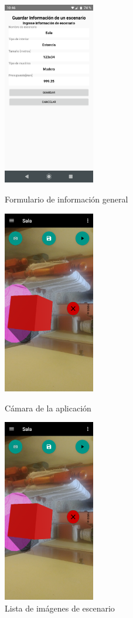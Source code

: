 \begin{figure}[hbt!]
	\begin{minipage}{0.32\textwidth}
		\centering
		\includegraphics[width=4cm,height=8cm]{imagenes/desarrollo/app/presave_scenario.png}
		\caption{Formulario de información general}
		\label{fig:infosc}
	\end{minipage}\hfill
	\begin{minipage}{0.32\textwidth}
		\centering
		\includegraphics[width=4cm,height=8cm]{imagenes/desarrollo/app/camera01.png}
		\caption{Cámara de la aplicación}
		\label{fig:camera01}
	\end{minipage}\hfill
	\begin{minipage}{0.32\textwidth}
		\centering
		\includegraphics[width=4cm,height=8cm]{imagenes/desarrollo/app/camera01.png}
		\caption{Lista de imágenes de escenario}
		\label{fig:scimg}
	\end{minipage}\hfill
\end{figure}


